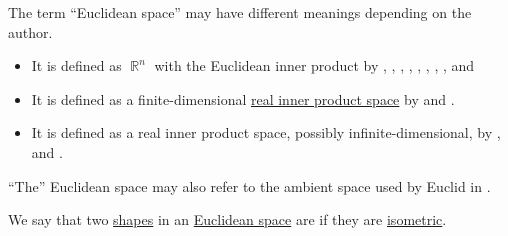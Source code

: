\begin{remark}\label{rem:euclidean_space_etymology}
  The term \enquote{Euclidean space} may have different meanings depending on the author.
  \begin{itemize}
    \item It is defined as \( \BbbR^n \) with the Euclidean inner product by
    ,
    ,
    ,
    ,
    ,
    ,
    ,
    ,
     and

    \item It is defined as a finite-dimensional \hyperref[def:inner_product_space]{real inner product space} by
     and
    .

    \item It is defined as a real inner product space, possibly infinite-dimensional, by
    ,
     and
    .
  \end{itemize}

  \enquote{The} Euclidean space may also refer to the ambient space used by Euclid in \cite{Euclid2008Elements}.
\end{remark}

\begin{definition}\label{def:congruent_shapes}
  We say that two \hyperref[con:geometric_shape]{shapes} in an \hyperref[def:euclidean_space]{Euclidean space} are  if they are \hyperref[def:isometry]{isometric}.
\end{definition}

